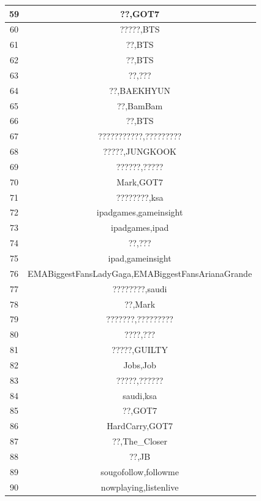\documentclass[11pt,a4paper,oneside]{article}
\begin{document}
\begin{center}
\begin{tabular}{|c|c|}
	    	\hline
	    	59 & ??,GOT7 \\ 
	    	\hline
	    	60 & ?????,BTS \\ 
	    	\hline
	    	61 & ??,BTS \\ 
	    	\hline
	    	62 & ??,BTS \\ 
	    	\hline
	    	63 & ??,??? \\ 
	    	\hline
	    	64 & ??,BAEKHYUN \\ 
	    	\hline
	    	65 & ??,BamBam \\ 
	    	\hline
	    	66 & ??,BTS \\ 
	    	\hline
	    	67 & ???????????,????????? \\ 
	    	\hline
	    	68 & ?????,JUNGKOOK \\ 
	    	\hline
	    	69 & ??????,????? \\ 
	    	\hline
	    	70 & Mark,GOT7 \\ 
	    	\hline
	    	71 & ????????,ksa \\ 
	    	\hline
	    	72 & ipadgames,gameinsight \\ 
	    	\hline
	    	73 & ipadgames,ipad \\ 
	    	\hline
	    	74 & ??,??? \\ 
	    	\hline
	    	75 & ipad,gameinsight \\ 
	    	\hline
	    	76 & EMABiggestFansLadyGaga,EMABiggestFansArianaGrande \\ 
	    	\hline
	    	77 & ????????,saudi \\
	    	\hline
	    	78 & ??,Mark \\ 
	    	\hline
	    	79 & ???????,????????? \\ 
	    	\hline
	    	80 & ????,??? \\ 
	    	\hline
	    	81 & ?????,GUILTY \\ 
	    	\hline
	    	82 & Jobs,Job \\ 
	    	\hline
	    	83 & ?????,?????? \\ 
	    	\hline
	    	84 & saudi,ksa \\ 
	    	\hline
	    	85 & ??,GOT7 \\ 
	    	\hline
	    	86 & HardCarry,GOT7 \\ 
	    	\hline
	    	87 & ??,The\_Closer \\ 
	    	\hline
	    	88 & ??,JB \\ 
	    	\hline
	    	89 & sougofollow,followme \\ 
	    	\hline
	    	90 & nowplaying,listenlive \\ 

\end{tabular}
\end{center}
\end{document}
